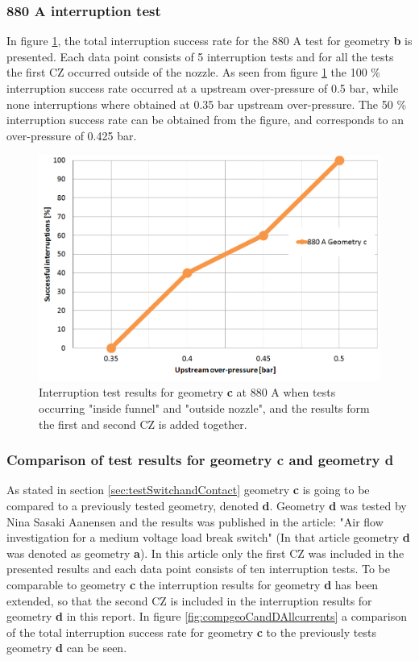 \documentclass[10pt,b5paper,twoside]{article}
\begin{document}
\subsubsection*{880 A interruption test}
In figure \ref{fig:results880AgeoC}, the total interruption success rate for the 880 A test for geometry \textbf{b} is presented. Each data point consists of 5 interruption tests and for all the tests the first CZ occurred outside of the nozzle. As seen from figure \ref{fig:results880AgeoC} the 100 \% interruption success rate occurred at a upstream over-pressure of 0.5 bar, while none interruptions where obtained at 0.35 bar upstream over-pressure. The 50 \% interruption success rate can be obtained from the figure, and corresponds to an over-pressure of 0.425 bar.

\begin{figure}[H]
\centering
\includegraphics[scale=0.45]{Bilder/Results/geoC880amp.PNG}
\caption{Interruption test results for geometry \textbf{c} at 880 A when tests occurring "inside funnel" and "outside nozzle", and the results form the first and second CZ is added together.} \label{fig:results880AgeoC}
\end{figure}

\subsubsection{Comparison of test results for geometry \textbf{c} and geometry \textbf{d}}

As stated in section \ref{sec:testSwitchandContact} geometry \textbf{c} is going to be compared to a previously tested geometry, denoted \textbf{d}. Geometry \textbf{d} was tested by Nina Sasaki Aanensen and the results was published in the article: "Air flow investigation for a medium voltage load break switch" \cite{bib:AFIMVLBA} (In that article geometry \textbf{d} was denoted as geometry \textbf{a}). In this article only the first CZ was included in the presented results and each data point consists of ten interruption tests. To be comparable to geometry \textbf{c} the interruption results for geometry \textbf{d} has been extended, so that the second CZ is included in the interruption results for geometry \textbf{d} in this report. In figure \ref{fig:compgeoCandDAllcurrents} a comparison of the total interruption success rate for geometry \textbf{c} to the previously tests geometry \textbf{d} can be seen.
\end{document}
